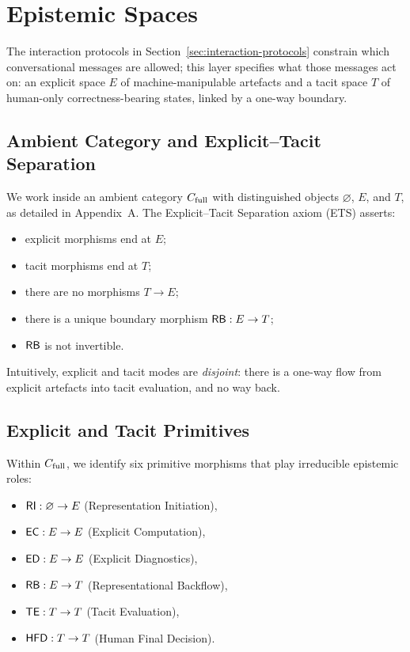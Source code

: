 \section{Epistemic Spaces}
\label{sec:epistemic-spaces}

The interaction protocols in Section~\ref{sec:interaction-protocols} constrain which conversational messages are allowed; this layer specifies what those messages act on: an explicit space \(E\) of machine-manipulable artefacts and a tacit space \(T\) of human-only correctness-bearing states, linked by a one-way boundary.

\subsection{Ambient Category and Explicit--Tacit Separation}

We work inside an ambient category \(C_{\mathrm{full}}\) with distinguished objects \(\varnothing\), \(E\), and \(T\), as detailed in Appendix~A. The Explicit--Tacit Separation axiom (ETS) asserts:
\begin{itemize}[leftmargin=2em]
  \item explicit morphisms end at \(E\);
  \item tacit morphisms end at \(T\);
  \item there are no morphisms \(T \to E\);
  \item there is a unique boundary morphism \(\mathsf{RB}:E\to T\);
  \item \(\mathsf{RB}\) is not invertible.
\end{itemize}

Intuitively, explicit and tacit modes are \emph{disjoint}: there is a one-way flow from explicit artefacts into tacit evaluation, and no way back.

\subsection{Explicit and Tacit Primitives}

Within \(C_{\mathrm{full}}\), we identify six primitive morphisms that play irreducible epistemic roles:
\begin{itemize}[leftmargin=2em]
  \item \(\mathsf{RI} : \varnothing \to E\) (Representation Initiation),
  \item \(\mathsf{EC} : E \to E\) (Explicit Computation),
  \item \(\mathsf{ED} : E \to E\) (Explicit Diagnostics),
  \item \(\mathsf{RB} : E \to T\) (Representational Backflow),
  \item \(\mathsf{TE} : T \to T\) (Tacit Evaluation),
  \item \(\mathsf{HFD} : T \to T\) (Human Final Decision).
\end{itemize}

